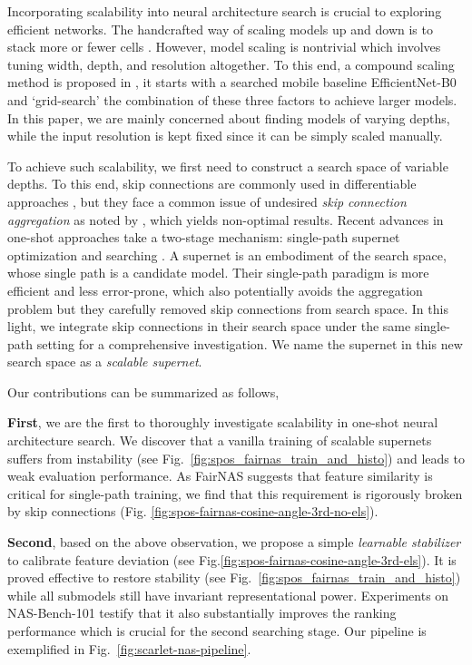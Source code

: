 \documentclass[runningheads]{llncs}
\begin{document}
Incorporating scalability into neural architecture search is crucial to exploring efficient networks. The handcrafted way of scaling models up and down is to stack more or fewer cells \cite{he2016deep,zoph2018learning}. However, model scaling is nontrivial which involves tuning width, depth, and resolution altogether. To this end, a compound scaling method is proposed in \cite{tan2019efficientnet}, it starts with a searched mobile baseline EfficientNet-B0 and `grid-search' the combination of these three factors to achieve larger models. In this paper, we are mainly concerned about finding models of varying depths, while the input resolution is kept fixed since it can be simply scaled manually.

To achieve such scalability, we first need to construct a search space of variable depths. To this end, skip connections are commonly used in differentiable approaches \cite{cai2018proxylessnas,wu2018fbnet}, but they face a common issue of undesired \emph{skip connection aggregation} as noted by \cite{chen2019progressive,zela2019understanding}, which yields non-optimal results. Recent advances in one-shot approaches take a two-stage mechanism: single-path supernet optimization and searching \cite{guo2019single,chu2019fairnas}. A supernet is an embodiment of the search space, whose single path is a candidate model. 
Their single-path paradigm is more efficient and less error-prone, which also potentially avoids the aggregation problem but they carefully removed skip connections from search space. In this light, we integrate skip connections in their search space under the same single-path setting for a comprehensive investigation. We name the supernet in this new search space as a \emph{scalable supernet}.

Our contributions can be summarized as follows,

\textbf{First}, we are the first to thoroughly investigate scalability in one-shot neural architecture search. We discover that a vanilla training of scalable supernets suffers from instability (see Fig.~\ref{fig:spos_fairnas_train_and_histo}) and leads to weak evaluation performance. As FairNAS \cite{chu2019fairnas} suggests that feature similarity is critical for single-path training, we find that this requirement is rigorously broken by skip connections (Fig. \ref{fig:spos-fairnas-cosine-angle-3rd-no-els}).

\textbf{Second}, based on the above observation, we propose a simple \emph{learnable stabilizer} to calibrate feature deviation (see Fig.\ref{fig:spos-fairnas-cosine-angle-3rd-els}). It is proved effective to restore stability (see Fig.~\ref{fig:spos_fairnas_train_and_histo}) while all submodels still have invariant representational power.  Experiments on NAS-Bench-101 \cite{ying2019bench} testify that it also substantially improves the ranking performance which is crucial for the second searching stage. Our pipeline is exemplified in Fig.~\ref{fig:scarlet-nas-pipeline}.
\end{document}
